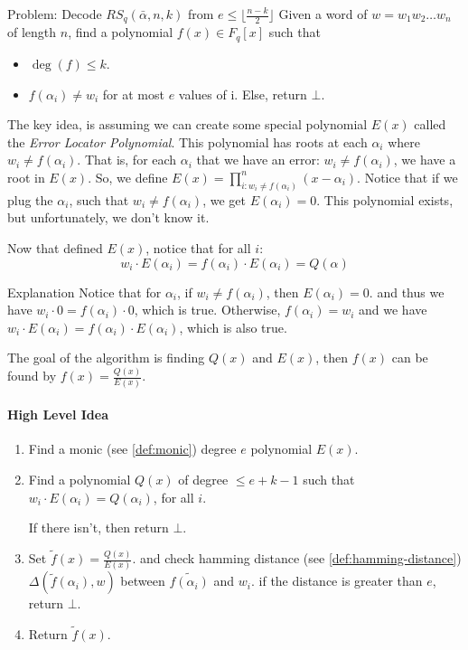 \begin{bclogo}[logo=\bcattention,noborder=true]{Problem: Decode $RS_q(\bar{\alpha},n,k)$ from $e\le \lfloor\frac{n-k}{2}\rfloor$}
Given a word of $w=w_1w_2\dots w_n$ of length $n$, 
find a polynomial $f(x)\in F_q[x]$ such that
\begin{itemize}
    \item $\deg(f)\le k$.
    \item $f(\alpha_i)\ne w_i$ for at most $e$ values of i. Else, return $\bot$.
\end{itemize}

\end{bclogo}

The key idea, is assuming we can create some special polynomial $E(x)$ called the \emph{Error Locator Polynomial}.
This polynomial has roots at each $\alpha_i$ where $w_i\ne f(\alpha_i)$. That is, 
for each $\alpha_i$  that we have an error: $w_i\ne f(\alpha_i)$, we have a root in $E(x)$.
So, we define $ E(x) = \prod_{i:w_i\ne f(\alpha_i)}^{n} (x-\alpha_i)$.
Notice that if we plug the $\alpha_i$, such that $w_i\ne f(\alpha_i)$, we get $E(\alpha_i)=0$.
This polynomial exists, but unfortunately, we don't know it. 

Now that defined $E(x)$, notice that for all $i$:
$$ w_i\cdot E(\alpha_i) = f(\alpha_i)\cdot E(\alpha_i)= Q(\alpha)$$


\begin{bclogo}[logo=\bcinfo,noborder=true]{Explanation}
    Notice that for $\alpha_i$, if $w_i\ne f(\alpha_i)$, then $E(\alpha_i)=0$.
    and thus we have $w_i\cdot 0 = f(\alpha_i)\cdot 0$, which is true.
    Otherwise, $f(\alpha_i)=w_i$ and we have
     $w_i\cdot E(\alpha_i) = f(\alpha_i)\cdot E(\alpha_i)$, which is also true.
\end{bclogo}

The goal of the algorithm is finding $Q(x)$ and $E(x)$,
 then $f(x)$ can be found by $f(x)=\frac{Q(x)}{E(x)}$.

\paragraph{High Level Idea}
\begin{enumerate}
    \item Find a monic (see \autoref{def:monic}) degree $e$ polynomial $E(x)$.
    \item Find a polynomial $Q(x)$ of degree $\le e+k-1$ such 
    that $w_i\cdot E(\alpha_i)=Q(\alpha_i)$, for all $i$.

    If there isn't, then return $\bot$.
    \item Set $\tilde{f}(x)=\frac{Q(x)}{E(x)}$. and check hamming distance 
    (see \autoref{def:hamming-distance}) $\Delta(\tilde{f}(\alpha_i),w)$ 
    between $\tilde{f(\alpha_i)}$ and $w_i$.
    if the distance is greater than $e$, return $\bot$.
    \item Return $\tilde{f}(x)$.
\end{enumerate}



